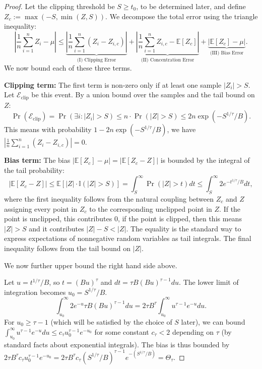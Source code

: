 \documentclass[11pt]{article}
\numberwithin{thm}{section}
\theoremstyle{plain}
\theoremstyle{definition}
\theoremstyle{remark} \newtheorem{remark}[thm]{Remark}
\newcommand{\E}{\mathbb{E}}
\begin{document}
\begin{proof}
Let the clipping threshold be $S \geq t_0$, to be determined later, and define $Z_c := \max(-S, \min(Z, S))$. 
We decompose the total error using the triangle inequality:
\[
\left|\frac{1}{n}\sum_{i=1}^n Z_i - \mu\right| \le \underbrace{\left|\frac{1}{n}\sum_{i=1}^n (Z_i - Z_{i,c})\right|}_{\text{(I) Clipping Error}} + \underbrace{\left|\frac{1}{n}\sum_{i=1}^n Z_{i,c} - \E[Z_c]\right|}_{\text{(II) Concentration Error}} + \underbrace{|\E[Z_c] - \mu|}_{\text{(III) Bias Error}}.
\]
We now bound each of these three terms.

\textbf{Clipping term:} 
The first term is non-zero only if at least one sample $|Z_i| > S$. 
Let $\mathcal{E}_{\text{clip}}$ be this event. 
By a union bound over the samples and the tail bound on $Z$:
\[
\Pr(\mathcal{E}_{\text{clip}}) = \Pr(\exists i: |Z_i| > S) \le n \cdot \Pr(|Z| > S) \le 2n \exp(-S^{1/\tau}/B).
\]
This means with probability $1-2n \exp(-S^{1/\tau}/B)$, we have $\left|\frac{1}{n}\sum_{i=1}^n (Z_i - Z_{i,c})\right| = 0$.

\textbf{Bias term:} The bias $|\E[Z_c] - \mu| = |\E[Z_c - Z]|$ is bounded by the integral of the tail probability:
\[
|\E[Z_c - Z]| \le \E[|Z| \cdot \mathbb{I}(|Z|>S)] = \int_S^\infty \Pr(|Z|>t)dt \le \int_S^\infty 2e^{-t^{1/\tau}/B}dt,
\]
where the first inequality follows from the natural coupling between $Z_c$ and $Z$ assigning every point in $Z_c$ to the corresponding unclipped point in $Z$. 
If the point is unclipped, this contributes $0$,
if the point is clipped, then this means $|Z| > S$ and it contributes $|Z|-S < |Z|$. 
The equality is the standard way to express expectations of nonnegative random variables as tail integrals. 
The final inequality follows from the tail bound on $|Z|$. 

We now further upper bound the right hand side above.

Let $u = t^{1/\tau}/B$, so $t = (Bu)^\tau$ and $dt = \tau B (Bu)^{\tau-1} du$. 
The lower limit of integration becomes $u_0 = S^{1/\tau}/B$.
\[
\int_{u_0}^\infty 2e^{-u} \tau B (Bu)^{\tau-1} du = 2\tau B^\tau \int_{u_0}^\infty u^{\tau-1} e^{-u} du.
\]
For $u_0 \ge \tau-1$ (which will be satisfied by the choice of \(S\) later), 
we can bound $\int_{u_0}^\infty u^{\tau-1} e^{-u} du \le c_\tau u_0^{\tau-1} e^{-u_0}$ for some constant $c_\tau < 2$ depending on $\tau$ 
(by standard facts about exponential integrals). 
The bias is thus bounded by $2\tau B^\tau c_\tau u_0^{\tau -1} e^{-u_0} = 2\tau B^\tau c_\tau (S^{1/\tau}/B)^{\tau -1} e^{-(S^{1/\tau}/B)} = \Theta_\tau$.



\end{proof}
\end{document}
